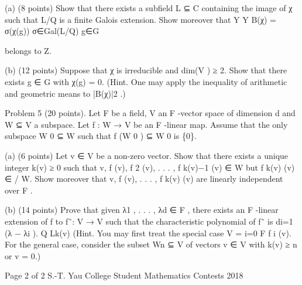 \documentclass[UTF8,12pt]{ctexart}
\begin{document}
(a) (8 points) Show that there exists a subfield L ⊆ C containing the image of χ such that L/Q is a finite Galois extension. Show moreover that Y Y B(χ) = σ(χ(g)) σ∈Gal(L/Q) g∈G

belongs to Z.

(b) (12 points) Suppose that χ is irreducible and dim(V ) ≥ 2. Show that there exists g ∈ G with χ(g) = 0. (Hint. One may apply the inequality of arithmetic and geometric means to |B(χ)|2 .)

Problem 5 (20 points). Let F be a field, V an F -vector space of dimension d and W ⊆ V a subspace. Let f : W → V be an F -linear map. Assume that the only subspace W 0 ⊆ W such that f (W 0 ) ⊆ W 0 is \{0\}.

(a) (6 points) Let v ∈ V be a non-zero vector. Show that there exists a unique integer k(v) ≥ 0 such that v, f (v), f 2 (v), . . . , f k(v)−1 (v) ∈ W but f k(v) (v) ∈ / W. Show moreover that v, f (v), . . . , f k(v) (v) are linearly independent over F .

(b) (14 points) Prove that given λ1 , . . . , λd ∈ F , there exists an F -linear extension of f to f˜: V → V such that the characteristic polynomial of f˜ is di=1 (λ − λi ). Q Lk(v) (Hint. You may first treat the special case V = i=0 F f i (v). For the general case, consider the subset Wn ⊆ V of vectors v ∈ V with k(v) ≥ n or v = 0.)

Page 2 of 2 S.-T. Yau College Student Mathematics Contests 2018
\end{document}
